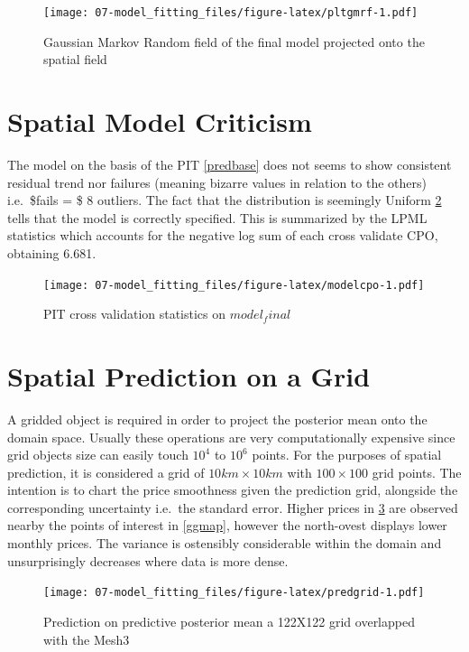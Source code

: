 \documentclass[
  12pt,
  a4paper,
  oneside]{book}
\theoremstyle{definition}
\theoremstyle{definition}
\theoremstyle{definition}
\theoremstyle{remark}
\begin{document}
\begin{figure}
\centering
\texttt{[image: 07-model\_fitting\_files/figure-latex/pltgmrf-1.pdf]}
\caption{\label{fig:pltgmrf}Gaussian Markov Random field of the final model projected onto the spatial field}
\end{figure}

\hypertarget{spatial-model-criticism}{%
\section{Spatial Model Criticism}\label{spatial-model-criticism}}

The model on the basis of the PIT \ref{predbase} does not seems to show consistent residual trend nor failures (meaning bizarre values in relation to the others) i.e.~\$fails = \$ 8 outliers. The fact that the distribution is seemingly Uniform \ref{fig:modelcpo} tells that the model is correctly specified. This is summarized by the LPML statistics which accounts for the negative log sum of each cross validate CPO, obtaining 6.681.

\begin{figure}
\centering
\texttt{[image: 07-model\_fitting\_files/figure-latex/modelcpo-1.pdf]}
\caption{\label{fig:modelcpo}PIT cross validation statistics on \(model_final\)}
\end{figure}

\hypertarget{spatial-prediction-on-a-grid}{%
\section{Spatial Prediction on a Grid}\label{spatial-prediction-on-a-grid}}

A gridded object is required in order to project the posterior mean onto the domain space. Usually these operations are very computationally expensive since grid objects size can easily touch \(10^4\) to \(10^6\) points. For the purposes of spatial prediction, it is considered a grid of \(10km \times 10km\) with \(100 \times 100\) grid points. The intention is to chart the price smoothness given the prediction grid, alongside the corresponding uncertainty i.e.~the standard error.
Higher prices in \ref{fig:predgrid} are observed nearby the points of interest in \ref{ggmap}, however the north-ovest displays lower monthly prices. The variance is ostensibly considerable within the domain and unsurprisingly decreases where data is more dense.

\begin{figure}
\centering
\texttt{[image: 07-model\_fitting\_files/figure-latex/predgrid-1.pdf]}
\caption{\label{fig:predgrid}Prediction on predictive posterior mean a 122X122 grid overlapped with the Mesh3}
\end{figure}
\end{document}
